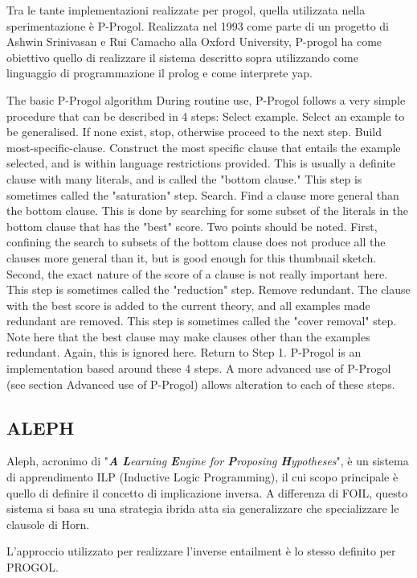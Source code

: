 Tra le tante implementazioni realizzate per progol, quella utilizzata nella sperimentazione è P-Progol. Realizzata nel 1993 come parte di un progetto di Ashwin Srinivasan e Rui Camacho alla Oxford University, P-progol ha come obiettivo quello di realizzare il sistema descritto sopra utilizzando come linguaggio di programmazione il prolog e come interprete yap.

The basic P-Progol algorithm
During routine use, P-Progol follows a very simple procedure that can be described in 4 steps:
Select example. Select an example to be generalised. If none exist, stop, otherwise proceed to the next step.
Build most-specific-clause. Construct the most specific clause that entails the example selected, and is within language restrictions provided. This is usually a definite clause with many literals, and is called the "bottom clause." This step is sometimes called the "saturation" step.
Search. Find a clause more general than the bottom clause. This is done by searching for some subset of the literals in the bottom clause that has the "best" score. Two points should be noted. First, confining the search to subsets of the bottom clause does not produce all the clauses more general than it, but is good enough for this thumbnail sketch. Second, the exact nature of the score of a clause is not really important here. This step is sometimes called the "reduction" step.
Remove redundant. The clause with the best score is added to the current theory, and all examples made redundant are removed. This step is sometimes called the "cover removal" step. Note here that the best clause may make clauses other than the examples redundant. Again, this is ignored here. Return to Step 1.
P-Progol is an implementation based around these 4 steps. A more advanced use of P-Progol (see section Advanced use of P-Progol) allows alteration to each of these steps.

\subsection{ALEPH}
Aleph, acronimo di "\emph{\textbf{A} \textbf{L}earning \textbf{E}ngine for \textbf{P}roposing \textbf{H}ypotheses}", è un sistema di apprendimento ILP (Inductive Logic Programming), il cui scopo principale è quello di  definire il concetto di implicazione inversa.
A differenza di FOIL, questo sistema si basa su una strategia ibrida atta sia generalizzare che specializzare le clausole di Horn. 

L'approccio utilizzato per realizzare l'inverse entailment è lo stesso definito per PROGOL.

